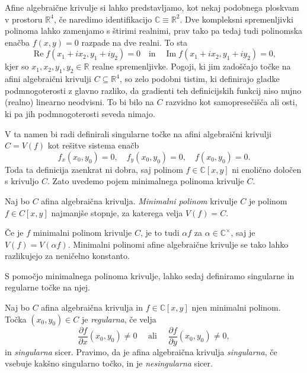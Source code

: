 \documentclass[mat1]{fmfdelo}
\newcommand{\R}{\mathbb R}
\newcommand{\C}{\mathbb C}
\newcommand{\CM}{\mathbb C ^\times}
\renewcommand\Re{\operatorname{Re}}%
\renewcommand\Im{\operatorname{Im}}%
\theoremstyle{definition}
\begin{document}
Afine algebraične krivulje si lahko predstavljamo, kot nekaj podobnega ploskvam v prostoru $\R^4$, če naredimo identifikacijo $\C \equiv \R^2$. Dve kompleksni spremenljivki polinoma lahko zamenjamo s štirimi realnimi, prav tako pa tedaj tudi polinomska enačba $f(x,y) = 0$ razpade na dve realni. To sta
\[
    \Re f(x_1 + ix_2, y_1 + iy_2) = 0 \quad \text{in} \quad \Im f(x_1 + ix_2, y_1 + iy_2) = 0,
\]
kjer so $x_1, x_2, y_1, y_2 \in \R$ realne spremenljivke.
Pogoji, ki jim zadoščajo točke na afini algebraični krivulji $C \subseteq \R^4$, so zelo podobni tistim, ki definirajo gladke pod\-mnogoterosti z glavno razliko, da gradienti teh definicijskih funkcij niso nujno (realno) linearno neodvisni. To bi bilo na $C$ razvidno kot samopresečišča ali osti, ki pa jih podmnogoterosti seveda nimajo. 
\par
V ta namen bi radi definirali singularne točke na afini algebraični krivulji $C = V(f)$ kot rešitve sistema enačb 
\[ 
    f_x(x_0, y_0) = 0, \quad f_y(x_0, y_0) = 0, \quad f(x_0, y_0) = 0.
\]
Toda ta definicija zaenkrat ni dobra, saj polinom $f \in \C[x,y]$ ni enolično določen s krivuljo $C$. 
Zato uvedemo pojem minimalnega polinoma krivulje $C$.

\begin{definicija}
    Naj bo $C$ afina algebraična krivulja. \emph{Minimalni polinom} krivulje $C$ je polinom $f \in C[x,y]$ najmanjše stopnje, za katerega velja $V(f) = C$.
\end{definicija}

\begin{opomba}
    Če je $f$ minimalni polinom krivulje $C$, je to tudi $\alpha f$ za $\alpha \in \CM$, saj je $V(f) = V(\alpha f)$. Minimalni polinomi afine algebraične krivulje se tako lahko razlikujejo za neničelno konstanto.
\end{opomba}

S pomočjo minimalnega polinoma krivulje, lahko sedaj definiramo singularne in regularne točke na njej.

\begin{definicija}
    \label{reg sing tocke}
    Naj bo $C$ afina algebraična krivulja in $f \in \C[x,y]$ njen minimalni polinom. Točka $(x_0, y_0) \in C$ je \emph{regularna}, če velja
    \[
        \frac{\partial f}{\partial x}(x_0, y_0) \neq 0 \quad \text{ ali } \quad \frac{\partial f}{\partial y}(x_0, y_0) \neq 0,
    \] 
    in \emph{singularna} sicer. Pravimo, da je afina algebraična krivulja \emph{singularna}, če vsebuje kakšno singularno točko, in je \emph{nesingularna} sicer.
\end{definicija}
\end{document}
